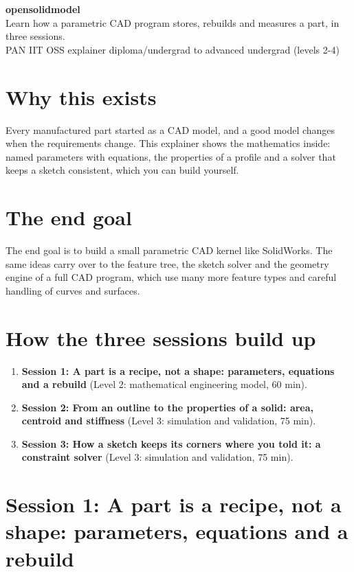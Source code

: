 \documentclass[11pt,a4paper]{article}
\begin{document}
\begin{center}{\LARGE\bfseries opensolidmodel}\\[0.4em]{\large Learn how a parametric CAD program stores, rebuilds and measures a part, in three sessions.}\\[0.2em]\small PAN IIT OSS explainer \textbullet{} diploma/undergrad to advanced undergrad (levels 2-4)\end{center}

\section*{Why this exists}
Every manufactured part started as a CAD model, and a good model changes when the requirements change. This explainer shows the mathematics inside: named parameters with equations, the properties of a profile and a solver that keeps a sketch consistent, which you can build yourself.

\section*{The end goal}
The end goal is to build a small parametric CAD kernel like SolidWorks. The same ideas carry over to the feature tree, the sketch solver and the geometry engine of a full CAD program, which use many more feature types and careful handling of curves and surfaces.

\section*{How the three sessions build up}
\begin{enumerate}[nosep]
\item \textbf{Session 1: A part is a recipe, not a shape: parameters, equations and a rebuild} (Level 2: mathematical engineering model, 60 min).
\item \textbf{Session 2: From an outline to the properties of a solid: area, centroid and stiffness} (Level 3: simulation and validation, 75 min).
\item \textbf{Session 3: How a sketch keeps its corners where you told it: a constraint solver} (Level 3: simulation and validation, 75 min).
\end{enumerate}

\section{Session 1: A part is a recipe, not a shape: parameters, equations and a rebuild}
\end{document}
